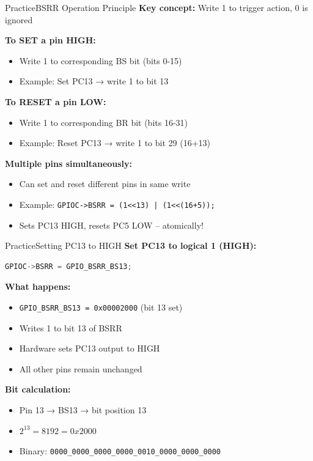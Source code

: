 \documentclass{beamer}
\begin{document}
\begin{frame}{Practice}{BSRR Operation Principle}
	\textbf{Key concept:} Write 1 to trigger action, 0 is ignored
	
	\medskip
	\textbf{To SET a pin HIGH:}
	\begin{itemize}
		\item Write 1 to corresponding BS bit (bits 0-15)
		\item Example: Set PC13 → write 1 to bit 13
	\end{itemize}
	
	\medskip
	\textbf{To RESET a pin LOW:}
	\begin{itemize}
		\item Write 1 to corresponding BR bit (bits 16-31)
		\item Example: Reset PC13 → write 1 to bit 29 (16+13)
	\end{itemize}
	
	\medskip
	\textbf{Multiple pins simultaneously:}
	\begin{itemize}
		\item Can set and reset different pins in same write
		\item Example: \texttt{GPIOC->BSRR = (1<<13) | (1<<(16+5));}
		\item Sets PC13 HIGH, resets PC5 LOW – atomically!
	\end{itemize}
\end{frame}
\begin{frame}[fragile]{Practice}{Setting PC13 to HIGH}
	\textbf{Set PC13 to logical 1 (HIGH):}
	
	\begin{lstlisting}[language=C, basicstyle=\ttfamily\small]
		GPIOC->BSRR = GPIO_BSRR_BS13;
	\end{lstlisting}
	
	\medskip
	\textbf{What happens:}
	\begin{itemize}
		\item \texttt{GPIO\_BSRR\_BS13 = 0x00002000} (bit 13 set)
		\item Writes 1 to bit 13 of BSRR
		\item Hardware sets PC13 output to HIGH
		\item All other pins remain unchanged
	\end{itemize}
	
	\medskip
	\textbf{Bit calculation:}
	\begin{itemize}
		\item Pin 13 → BS13 → bit position 13
		\item $2^{13} = 8192 = 0x2000$
		\item Binary: \texttt{0000\_0000\_0000\_0000\_0010\_0000\_0000\_0000}
	\end{itemize}
\end{frame}
\end{document}
